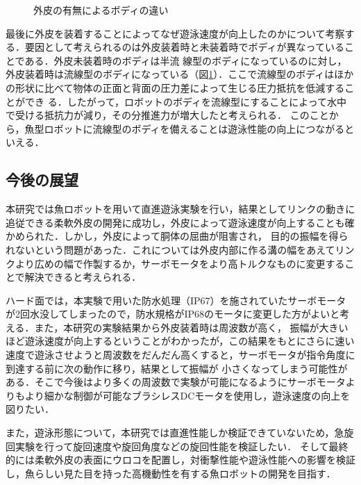 \begin{figure}[t]
    \centering
    \caption{外皮の有無によるボディの違い}
    \label{fig:body}
\end{figure}

最後に外皮を装着することによってなぜ遊泳速度が向上したのかについて考察する．要因として考えられるのは外皮装着時と未装着時でボディが異なっていることである．外皮未装着時のボディは半流
線型のボディになっているのに対し，外皮装着時は流線型のボディになっている（図\ref{fig:body}）．ここで流線型のボディはほかの形状に比べて物体の正面と背面の圧力差によって生じる圧力抵抗を低減することができ
る．したがって，ロボットのボディを流線型にすることによって水中で受ける抵抗力が減り，その分推進力が増大したと考えられる．
このことから，魚型ロボットに流線型のボディを備えることは遊泳性能の向上につながるといえる．

\subsection{今後の展望}
本研究では魚ロボットを用いて直進遊泳実験を行い，結果としてリンクの動きに追従できる柔軟外皮の開発に成功し，外皮によって遊泳速度が向上することも確かめられた．しかし，外皮によって胴体の屈曲が阻害され，
目的の振幅を得られないという問題があった．これについては外皮内部に作る溝の幅をあえてリンクより広めの幅で作製するか，サーボモータをより高トルクなものに変更することで解決できると考えられる．

ハード面では，本実験で用いた防水処理（IP67）を施されていたサーボモータが2回水没してしまったので，防水規格がIP68のモータに変更した方がよいと考える．また，本研究の実験結果から外皮装着時は周波数が高く，
振幅が大きいほど遊泳速度が向上するということがわかったが，この結果をもとにさらに速い速度で遊泳させようと周波数をだんだん高くすると，サーボモータが指令角度に到達する前に次の動作に移り，結果として振幅が
小さくなってしまう可能性がある．そこで今後はより多くの周波数で実験が可能になるようにサーボモータよりもより細かな制御が可能なブラシレスDCモータを使用し，遊泳速度の向上を図りたい．

また，遊泳形態について，本研究では直進性能しか検証できていないため，急旋回実験を行って旋回速度や旋回角度などの旋回性能を検証したい．
そして最終的には柔軟外皮の表面にウロコを配置し，対衝撃性能や遊泳性能への影響を検証し，魚らしい見た目を持った高機動性を有する魚ロボットの開発を目指す．
